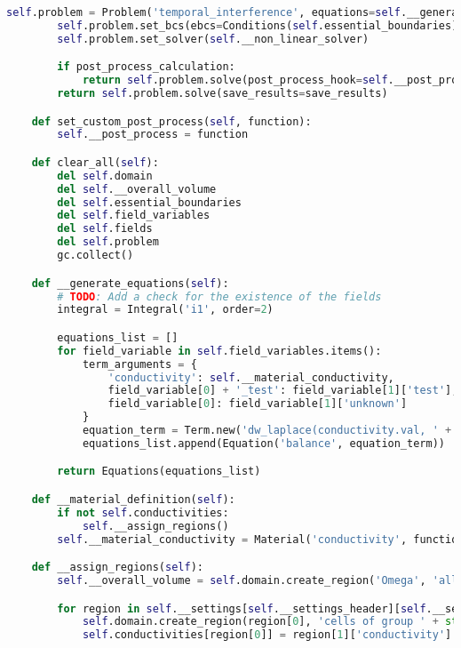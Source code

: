\begin{lstlisting}[language=Python,caption={Class interfacing to SfePy and contains routines for the PHM and spherical model \gls{FEM} solution.},captionpos=b,label=lst:fem_solver_class]
        self.problem = Problem('temporal_interference', equations=self.__generate_equations())
        self.problem.set_bcs(ebcs=Conditions(self.essential_boundaries))
        self.problem.set_solver(self.__non_linear_solver)

        if post_process_calculation:
            return self.problem.solve(post_process_hook=self.__post_process, save_results=save_results)
        return self.problem.solve(save_results=save_results)

    def set_custom_post_process(self, function):
        self.__post_process = function

    def clear_all(self):
        del self.domain
        del self.__overall_volume
        del self.essential_boundaries
        del self.field_variables
        del self.fields
        del self.problem
        gc.collect()

    def __generate_equations(self):
        # TODO: Add a check for the existence of the fields
        integral = Integral('i1', order=2)

        equations_list = []
        for field_variable in self.field_variables.items():
            term_arguments = {
                'conductivity': self.__material_conductivity,
                field_variable[0] + '_test': field_variable[1]['test'],
                field_variable[0]: field_variable[1]['unknown']
            }
            equation_term = Term.new('dw_laplace(conductivity.val, ' + field_variable[0] + '_test, ' + field_variable[0] + ')', integral, self.__overall_volume, **term_arguments)
            equations_list.append(Equation('balance', equation_term))

        return Equations(equations_list)

    def __material_definition(self):
        if not self.conductivities:
            self.__assign_regions()
        self.__material_conductivity = Material('conductivity', function=Function('get_conductivity', lambda ts, coors, mode=None, equations=None, term=None, problem=None, **kwargs: self.__get_conductivity(ts, coors, mode, equations, term, problem, conductivities=self.conductivities)))

    def __assign_regions(self):
        self.__overall_volume = self.domain.create_region('Omega', 'all')

        for region in self.__settings[self.__settings_header][self.__selected_model]['regions'].items():
            self.domain.create_region(region[0], 'cells of group ' + str(region[1]['id']))
            self.conductivities[region[0]] = region[1]['conductivity']


\end{lstlisting}
